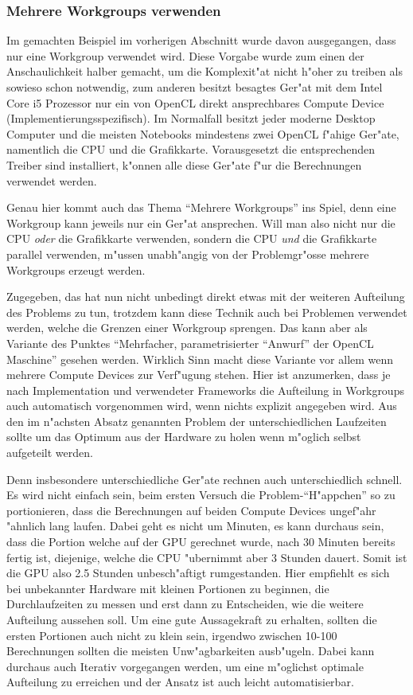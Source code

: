 \begin{refsection}
\subsubsection{Mehrere Workgroups verwenden}

Im gemachten Beispiel im vorherigen Abschnitt wurde davon ausgegangen,
dass nur eine Workgroup verwendet wird. Diese Vorgabe wurde zum einen
der Anschaulichkeit halber gemacht, um die Komplexit"at nicht h"oher zu
treiben als sowieso schon notwendig, zum anderen besitzt besagtes Ger"at
mit dem Intel Core i5 Prozessor nur ein von OpenCL direkt ansprechbares
Compute Device (Implementierungsspezifisch). Im Normalfall besitzt jeder
moderne Desktop Computer und die meisten Notebooks mindestens zwei 
OpenCL f"ahige Ger"ate, namentlich die CPU und die Grafikkarte. 
Vorausgesetzt die entsprechenden Treiber sind installiert, k"onnen alle
diese Ger"ate f"ur die Berechnungen verwendet werden.

Genau hier kommt auch das Thema ``Mehrere Workgroups'' ins Spiel, denn
eine Workgroup kann jeweils nur ein Ger"at ansprechen. Will man also
nicht nur die CPU \textit{oder} die Grafikkarte verwenden, sondern die 
CPU \textit{und} die Grafikkarte parallel verwenden, m"ussen unabh"angig
von der Problemgr"osse mehrere Workgroups erzeugt werden.

Zugegeben, das hat nun nicht unbedingt direkt etwas mit der weiteren 
Aufteilung des Problems zu tun, trotzdem kann diese Technik auch bei
Problemen verwendet werden, welche die Grenzen einer Workgroup sprengen.
Das kann aber als Variante des Punktes ``Mehrfacher, parametrisierter
``Anwurf'' der OpenCL Maschine'' gesehen werden. Wirklich Sinn macht 
diese Variante vor allem wenn mehrere Compute Devices zur Verf"ugung
stehen. Hier ist anzumerken, dass je nach Implementation und 
verwendeter Frameworks die Aufteilung in Workgroups auch automatisch
vorgenommen wird, wenn nichts explizit angegeben wird. Aus den im
n"achsten Absatz genannten Problem der unterschiedlichen Laufzeiten
sollte um das Optimum aus der Hardware zu holen wenn m"oglich selbst
aufgeteilt werden.

Denn insbesondere unterschiedliche Ger"ate rechnen
auch unterschiedlich schnell. Es wird nicht einfach sein, 
beim ersten Versuch die Problem-``H"appchen'' so zu portionieren, dass
die Berechnungen auf beiden Compute Devices ungef"ahr "ahnlich lang 
laufen. Dabei geht es nicht um Minuten, es kann durchaus sein, dass 
die Portion welche auf der GPU gerechnet wurde, nach 30 Minuten bereits
fertig ist, diejenige, welche die CPU "ubernimmt aber 3 Stunden dauert.
Somit ist die GPU also 2.5 Stunden unbesch"aftigt rumgestanden. Hier
empfiehlt es sich bei unbekannter Hardware mit kleinen Portionen zu 
beginnen, die Durchlaufzeiten zu messen und erst dann zu Entscheiden,
wie die weitere Aufteilung aussehen soll. Um eine gute Aussagekraft
zu erhalten, sollten die ersten Portionen auch nicht zu klein sein,
irgendwo zwischen 10-100 Berechnungen sollten die meisten Unw"agbarkeiten
ausb"ugeln. Dabei kann durchaus auch Iterativ vorgegangen werden, um
eine m"oglichst optimale Aufteilung zu erreichen und der Ansatz ist
auch leicht automatisierbar.


\end{refsection}
